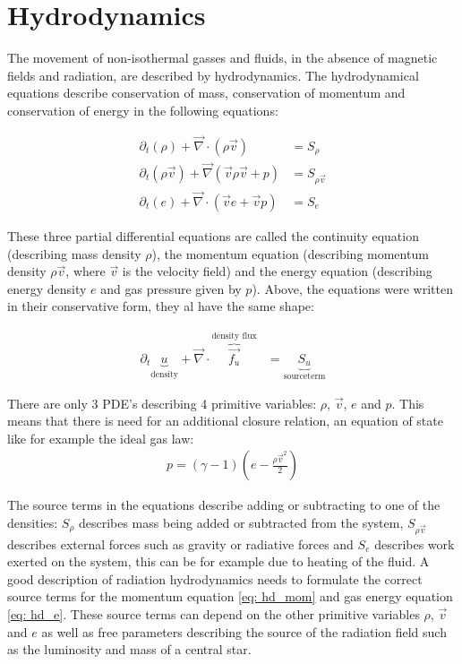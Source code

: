\section{Hydrodynamics}
The movement of non-isothermal gasses and fluids, in the absence of magnetic fields and radiation, are described by hydrodynamics. The hydrodynamical equations describe conservation of mass, conservation of momentum and conservation of energy in the following equations:

\begin{align}
 \partial_t \left(\rho \right) + \vec{\nabla} \cdot \left( \rho \vec{v}  \right) &= S_\rho \label{eq: hd_rho}\\
 \partial_t \left(\rho \vec{v} \right) + \vec{\nabla} \left( \vec{v} \rho \vec{v} + p \right) &= S_{\rho \vec{v}} \label{eq: hd_mom}\\
 \partial_t \left(e \right) + \vec{\nabla} \cdot \left( \vec{v} e + \vec{v} p \right) &= S_e \label{eq: hd_e}
\end{align}

These three partial differential equations are called the continuity equation (describing mass density $\rho$), the momentum equation (describing momentum density $\rho \vec{v}$, where $\vec{v}$ is the velocity field) and the energy equation (describing energy density $e$ and gas pressure given by $p$). Above, the equations were written in their conservative form, they al have the same shape:

\begin{align}
	\partial_t \underbrace{u}_\text{density} + \vec{\nabla} \cdot \overbrace{\vec{f_u}}^\text{density flux} &= \underbrace{S_u}_\text{sourceterm} \label{eq: conservative}
\end{align}

There are only 3 PDE's describing 4 primitive variables: $\rho$, $\vec{v}$, $e$ and $p$. This means that there is need for an additional closure relation, an equation of state like for example the ideal gas law:
\begin{align}
	p = (\gamma - 1) \left(e - \frac{\rho \vec{v}^2}{2} \right) \label{gas_closing}
\end{align}

The source terms in the equations describe adding or subtracting to one of the densities: $S_\rho$ describes mass being added or subtracted from the system, $S_{\rho \vec{v}}$ describes external forces such as gravity or radiative forces and $S_e$ describes work exerted on the system, this can be for example due to heating of the fluid. A good description of radiation hydrodynamics needs to formulate the correct source terms for the momentum equation \eqref{eq: hd_mom} and gas energy equation \eqref{eq: hd_e}. These source terms can depend on the other primitive variables $\rho$, $\vec{v}$ and $e$ as well as free parameters describing the source of the radiation field such as the luminosity and mass of a central star.\\

